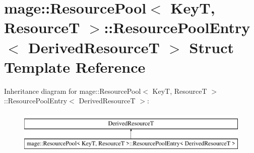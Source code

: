 \hypertarget{structmage_1_1_resource_pool_1_1_resource_pool_entry}{}\section{mage\+:\+:Resource\+Pool$<$ KeyT, ResourceT $>$\+:\+:Resource\+Pool\+Entry$<$ Derived\+ResourceT $>$ Struct Template Reference}
\label{structmage_1_1_resource_pool_1_1_resource_pool_entry}
Inheritance diagram for mage\+:\+:Resource\+Pool$<$ KeyT, ResourceT $>$\+:\+:Resource\+Pool\+Entry$<$ Derived\+ResourceT $>$\+:\begin{figure}[H]
\begin{center}
\leavevmode
\includegraphics[height=2.000000cm]{structmage_1_1_resource_pool_1_1_resource_pool_entry}
\end{center}
\end{figure}
